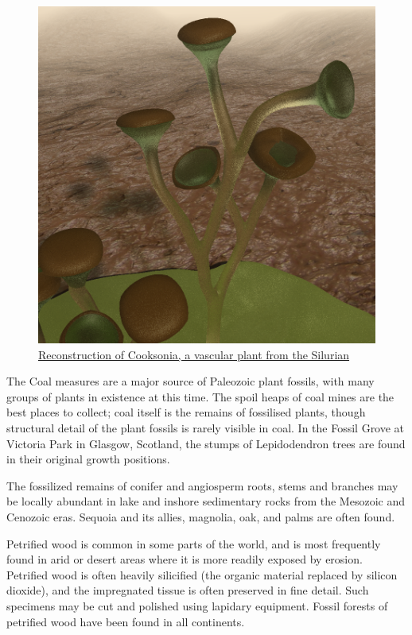 \begin{figure}

{\centering \includegraphics[width=0.7\linewidth]{./figures/plants/Cooksonia_pertoni} 

}

\caption{\href{https://commons.wikimedia.org/wiki/File:Cooksonia_pertoni.png}{Reconstruction of Cooksonia, a vascular plant from the Silurian}}\label{fig:cooksonia}
\end{figure}

The Coal measures are a major source of Paleozoic plant fossils, with many groups of plants in existence at this time. The spoil heaps of coal mines are the best places to collect; coal itself is the remains of fossilised plants, though structural detail of the plant fossils is rarely visible in coal. In the Fossil Grove at Victoria Park in Glasgow, Scotland, the stumps of Lepidodendron trees are found in their original growth positions.

The fossilized remains of conifer and angiosperm roots, stems and branches may be locally abundant in lake and inshore sedimentary rocks from the Mesozoic and Cenozoic eras. Sequoia and its allies, magnolia, oak, and palms are often found.

Petrified wood is common in some parts of the world, and is most frequently found in arid or desert areas where it is more readily exposed by erosion. Petrified wood is often heavily silicified (the organic material replaced by silicon dioxide), and the impregnated tissue is often preserved in fine detail. Such specimens may be cut and polished using lapidary equipment. Fossil forests of petrified wood have been found in all continents.

